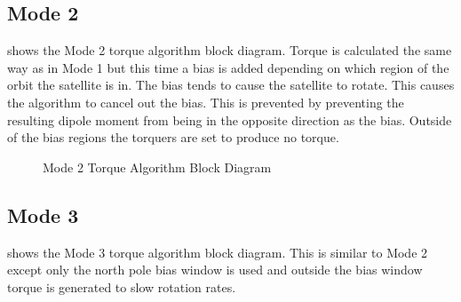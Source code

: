 \subsection{Mode 2}

 shows the Mode 2 torque algorithm block diagram. Torque is calculated the same way as in Mode 1 but this time a bias is added depending on which region of the orbit the satellite is in. The bias tends to cause the satellite to rotate. This causes the algorithm to cancel out the bias. This is prevented by preventing the resulting dipole moment from being in the opposite direction as the bias. Outside of the bias regions the torquers are set to produce no torque.

\begin{figure}[H]
    \centering
    \caption{Mode 2 Torque Algorithm Block Diagram}
    \label{fig:mode2}
\end{figure}

\subsection{Mode 3}

 shows the Mode 3 torque algorithm block diagram. This is similar to Mode 2 except only the north pole bias window is used and outside the bias window torque is generated to slow rotation rates.

